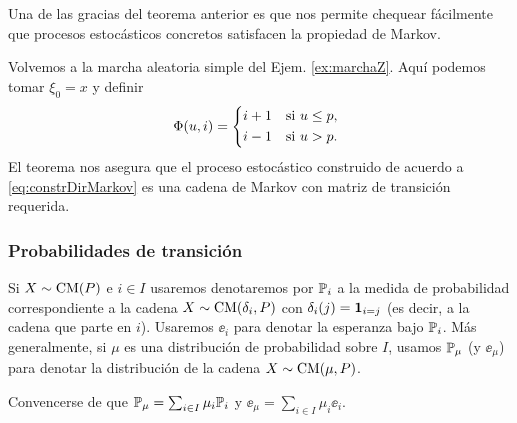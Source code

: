 Una de las gracias del teorema anterior es que nos permite chequear fácilmente que procesos estocásticos concretos satisfacen la propiedad de Markov.

\begin{ex}
Volvemos a la marcha aleatoria simple del Ejem. \ref{ex:marchaZ}.
Aquí podemos tomar $\xi_0=x$ y definir
\[\Phi(u,i)=\begin{dcases*}
i+1 & si $u\leq p$,\\
i-1 & si $u>p$.
\end{dcases*}\]
El teorema nos asegura que el proceso estocástico construido de acuerdo a \eqref{eq:constrDirMarkov} es una cadena de Markov con matriz de transición requerida.
\end{ex}

\subsubsection{Probabilidades de transición}

\begin{notation}
Si $X\sim\text{\upshape{CM}}(P)$ e $i\in I$ usaremos denotaremos por $\mathbb{P}_i$ a la medida de probabilidad correspondiente a la cadena $X\sim\text{\upshape{CM}}(\delta_i,P)$ con $\delta_i(j)=\mathbf{1}_{i=j}$ (es decir, a la cadena que parte en $i$).
Usaremos $\ee_i$ para denotar la esperanza bajo $\mathbb{P}_i$.
\lsep
Más generalmente, si $\mu$ es una distribución de probabilidad sobre $I$, usamos $\mathbb{P}_\mu$ (y $\ee_\mu$) para denotar la distribución de la cadena $X\sim\text{\upshape{CM}}(\mu,P)$.
\end{notation}

\begin{exer}
Convencerse de que $\mathbb{P}_\mu=\sum_{i\in I}\mu_i\mathbb{P}_i$ y $\ee_\mu=\sum_{i\in I}\mu_i\ee_i$.
\end{exer}

